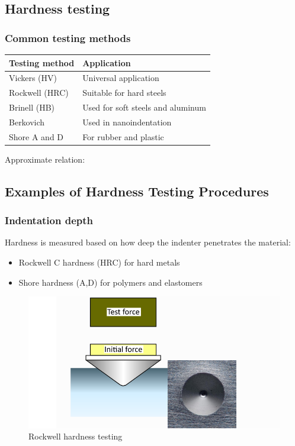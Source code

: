 \documentclass{article}
\begin{document}
\subsection{Hardness testing}
\subsubsection{Common testing methods}
\begin{table}[h!]
  \centering
  \begin{tabular}{|l|l|}
    \hline
    \textbf{Testing method} & \textbf{Application}\\
    \hline
    Vickers (HV) & Universal application\\
    \hline
    Rockwell (HRC) & Suitable for hard steels\\
    \hline
    Brinell (HB) & Used for soft steels and aluminum\\
    \hline
    Berkovich & Used in nanoindentation\\
    \hline
    Shore A and D & For rubber and plastic\\
    \hline
  \end{tabular}
\end{table}
\vspace*{.5cm}
Approximate relation:

\subsection{Examples of Hardness Testing Procedures}
\subsubsection{Indentation depth}
Hardness is measured based on how deep the indenter penetrates the material: 
\begin{itemize}
  \item Rockwell C hardness (HRC) for hard metals
  \item Shore hardness (A,D) for polymers and elastomers
\end{itemize}

\begin{figure}[ht!]
  \centering
  \includegraphics[width=.6\textwidth]{media/Rockwell_hardness.png}
  \caption*{Rockwell hardness testing}
\end{figure}
\end{document}
